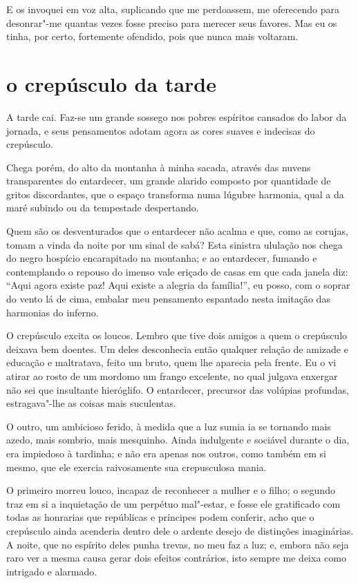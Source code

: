 E os invoquei em voz alta, suplicando que me perdoassem, me
oferecendo para desonrar"-me quantas vezes fosse preciso para merecer
seus favores. Mas eu os tinha, por certo, fortemente ofendido, pois que
nunca mais voltaram.

\quebra\section[O crepúsculo da tarde]{o crepúsculo da tarde}

A tarde cai. Faz-se um grande sossego nos pobres espíritos
cansados do labor da jornada, e seus pensamentos adotam agora as cores
suaves e indecisas do crepúsculo.

Chega porém, do alto da montanha à minha sacada, através das nuvens
transparentes do entardecer, um grande alarido composto por 
quantidade de gritos discordantes, que o espaço transforma numa lúgubre harmonia, qual a da maré subindo ou da tempestade despertando.

Quem são os desventurados que o entardecer não acalma e que, como as
corujas, tomam a vinda da noite por um sinal de sabá? Esta sinistra
ululação nos chega do negro hospício encarapitado na montanha; e
ao entardecer, fumando e contemplando o repouso do imenso vale eriçado
de casas em que cada janela diz: ``Aqui agora existe paz!
Aqui existe a alegria da família!'', eu posso, com o
soprar do vento lá de cima, embalar meu pensamento espantado nesta imitação
das harmonias do inferno.

O crepúsculo excita os loucos. Lembro que tive dois amigos a quem o
crepúsculo deixava bem doentes. Um deles desconhecia então qualquer
relação de amizade e educação e maltratava, feito um bruto,
quem lhe aparecia pela frente. Eu o vi atirar ao rosto de um
mordomo um frango excelente, no qual julgava enxergar não sei que
insultante hieróglifo. O entardecer, precursor das volúpias profundas,
estragava"-lhe as coisas mais suculentas.

\quebra

O outro, um ambicioso ferido, à medida que a luz sumia
ia se tornando mais azedo, mais sombrio, mais mesquinho. Ainda indulgente e sociável
durante o dia, era impiedoso à tardinha; e não era apenas nos outros,
como também em si mesmo, que ele exercia raivosamente sua 
crepusculosa mania.

O primeiro morreu louco, incapaz de reconhecer a mulher e o filho; o
segundo traz em si a inquietação de um perpétuo mal"-estar, e fosse
ele gratificado com todas as honrarias que repúblicas
e príncipes podem conferir, acho que o crepúsculo ainda acenderia dentro dele o ardente
desejo de distinções imaginárias. A noite, que no 
espírito deles punha trevas, no meu faz a luz; e, embora não seja raro ver a mesma
causa gerar dois efeitos contrários, isto sempre me deixa como 
intrigado e alarmado.

